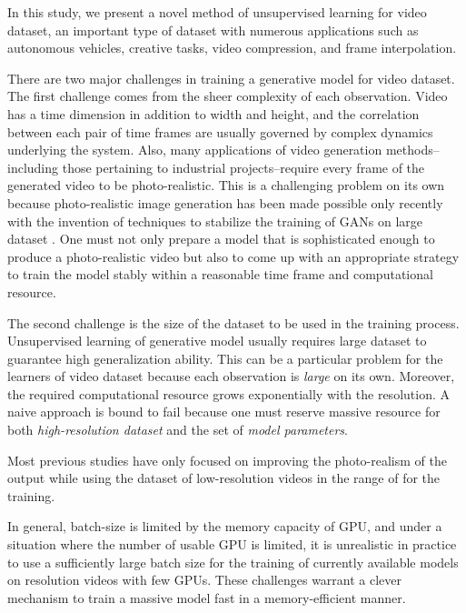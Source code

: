 \documentclass[twocolumn]{svjour3}
\begin{document}
In this study, we present a novel method of unsupervised learning for video dataset, an important type of dataset with numerous applications such as autonomous vehicles, creative tasks, video compression, and frame interpolation.







There are two major challenges in training a generative model for video dataset.
The first challenge comes from the sheer complexity of each observation.
Video has a time dimension in addition to width and height, and the correlation between each pair of time frames are usually governed by complex dynamics underlying the system.
Also, many applications of video generation methods--including those pertaining to industrial projects--require every frame of the generated video to be photo-realistic.
This is a challenging problem on its own because photo-realistic image generation has been made possible only recently with the invention of techniques to stabilize the training of GANs on large dataset \cite{Karras2018,Miyato2018,Mescheder2018}.
One must not only prepare a model that is sophisticated enough to produce a photo-realistic video but also to come up with an appropriate strategy to train the model stably within a reasonable time frame and computational resource.




The second challenge is the size of the dataset to be used in the training process.
Unsupervised learning of generative model usually requires large dataset to guarantee high generalization ability.
This can be a particular problem for the learners of video dataset because each observation is \textit{large} on its own.
Moreover, the required computational resource grows exponentially with the resolution.
A naive approach is bound to fail because one must reserve massive resource for both \textit{high-resolution dataset} and the set of \textit{model parameters}.











Most previous studies have only focused on improving the photo-realism of the output \cite{Vondrick2016,Saito2017,Tulyakov2018} while using the dataset of low-resolution videos in the range of  for the training.


In general, batch-size is limited by the memory capacity of GPU, and under a situation where the number of usable GPU is limited, it is unrealistic in practice to use a sufficiently large batch size for the training of currently available models on  resolution videos with few GPUs.
These challenges warrant a clever mechanism to train a massive model fast in a memory-efficient manner.
\end{document}
